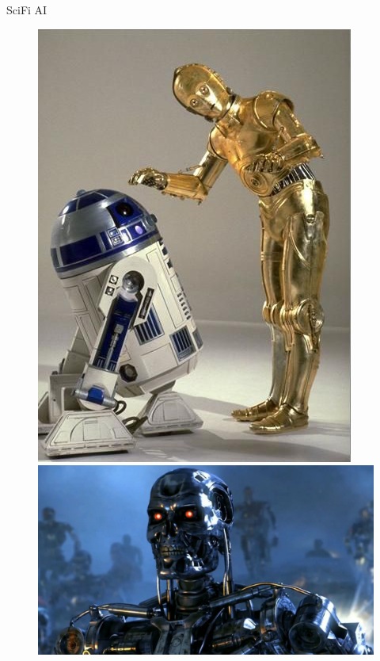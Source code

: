 \documentclass[10pt]{beamer}
\begin{document}
\begin{frame} {SciFi AI}
	\begin{figure}
		\centering
		\begin{minipage}{.33\textwidth}
		  \includegraphics[width=0.8 \linewidth, height=0.8 \textheight, keepaspectratio]{images/c3po_r2d2}
		\end{minipage}%
		\begin{minipage}{.33\textwidth}
				\begin{minipage}{\textwidth}
			  \includegraphics[width=0.8 \linewidth, height=0.8 \textheight, keepaspectratio]{images/terminator}
			\end{minipage}

\end{minipage}
\end{figure}
\end{frame}
\end{document}
